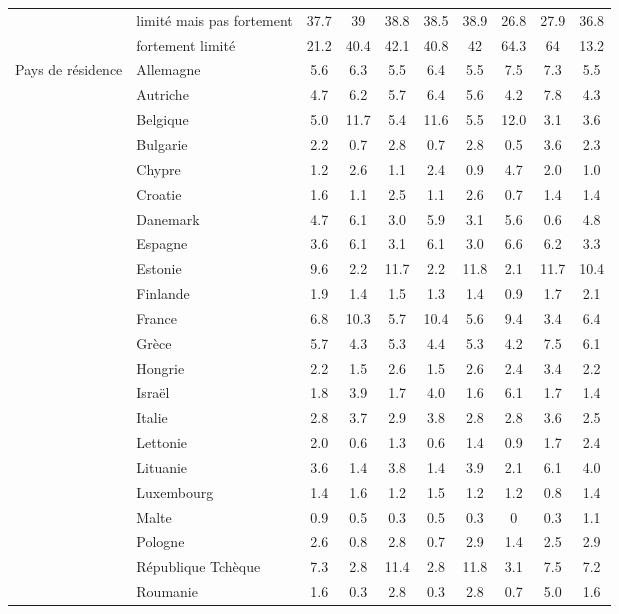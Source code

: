 \begin{Article}
\begin{refsection}[Bonnal]
\begin{appendices}
\begin{table}[!h]
{\begin{tabular}{l@{\;}l@{\;}S!{}S!{}S!{}S!{}S!{}S!{}S!{}S!{}}
		 & limité mais pas fortement & 37.7 & 39 & 38.8 & 38.5 & 38.9 & 26.8 & 27.9 & 36.8 \\
		 & fortement limité & 21.2 & 40.4 & 42.1 & 40.8 & 42 & 64.3 & 64 & 13.2 \\\hline
		Pays de résidence & Allemagne & 5.6 & 6.3 & 5.5 & 6.4 & 5.5 & 7.5 &7.3 & 5.5 \\
		& Autriche & 4.7 & 6.2 & 5.7 & 6.4 & 5.6 & 4.2 &7.8 & 4.3 \\
		& Belgique & 5.0 & 11.7 & 5.4 & 11.6 & 5.5 & 12.0 & 3.1 & 3.6 \\
		& Bulgarie & 2.2 & 0.7 & 2.8 & 0.7 & 2.8 & 0.5 & 3.6 & 2.3 \\
		& Chypre & 1.2 & 2.6 & 1.1 & 2.4 & 0.9 & 4.7 &2.0 & 1.0 \\
		& Croatie & 1.6 & 1.1 & 2.5 & 1.1 & 2.6 & 0.7 & 1.4 & 1.4 \\
		& Danemark & 4.7 & 6.1 & 3.0 & 5.9 & 3.1 & 5.6 & 0.6 & 4.8 \\
		& Espagne & 3.6 & 6.1 & 3.1 & 6.1 & 3.0 & 6.6 &6.2 & 3.3 \\
		& Estonie & 9.6 & 2.2 & 11.7 & 2.2 & 11.8 & 2.1 & 11.7 & 10.4 \\
		& Finlande & 1.9 & 1.4 & 1.5 & 1.3 & 1.4 & 0.9 & 1.7 & 2.1 \\
		& France & 6.8 & 10.3 & 5.7 & 10.4 & 5.6 & 9.4 & 3.4 & 6.4 \\
		& Grèce & 5.7 & 4.3 & 5.3 & 4.4 & 5.3 & 4.2 & 7.5 & 6.1 \\
		& Hongrie & 2.2 & 1.5 & 2.6 & 1.5 & 2.6 & 2.4 & 3.4 & 2.2 \\
		& Israël & 1.8 & 3.9 & 1.7 & 4.0 & 1.6 & 6.1 & 1.7 & 1.4 \\
		& Italie & 2.8 & 3.7 & 2.9 & 3.8 & 2.8 & 2.8 & 3.6 & 2.5 \\
		& Lettonie & 2.0 & 0.6 & 1.3 & 0.6 & 1.4 & 0.9 & 1.7 & 2.4 \\
		& Lituanie & 3.6 & 1.4 & 3.8 & 1.4 & 3.9 & 2.1 & 6.1 & 4.0 \\
		& Luxembourg & 1.4 & 1.6 & 1.2 & 1.5 & 1.2 & 1.2 & 0.8 & 1.4 \\
		& Malte & 0.9 & 0.5 & 0.3 & 0.5 & 0.3 & 0  & 0.3 & 1.1 \\
		& Pologne & 2.6 & 0.8 & 2.8 & 0.7 & 2.9 & 1.4 & 2.5 & 2.9 \\
		& République Tchèque & 7.3 & 2.8 & 11.4 & 2.8 & 11.8 & 3.1 & 7.5 & 7.2 \\
		& Roumanie & 1.6 & 0.3 & 2.8 & 0.3 & 2.8 & 0.7 & 5.0 & 1.6 \\

\end{tabular}}
\end{table}
\end{appendices}
\end{refsection}
\end{Article}
